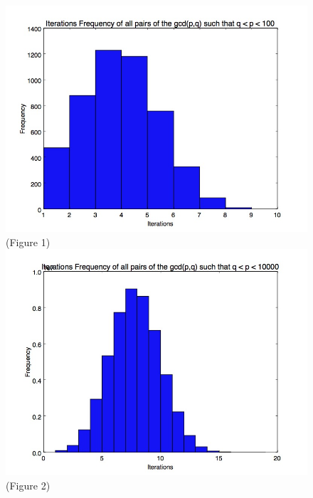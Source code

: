 \documentclass[11pt]{article}
\begin{document}
	\begin{figure}
		
		\center \includegraphics[scale=.4]{2digit_iterationfreq.jpg}
		\center \tiny(Figure 1)\\
		\includegraphics[scale=.4]{4digit_iteration_freq.jpg}
		\center \tiny(Figure 2)
	\end{figure}
	
\end{document}
